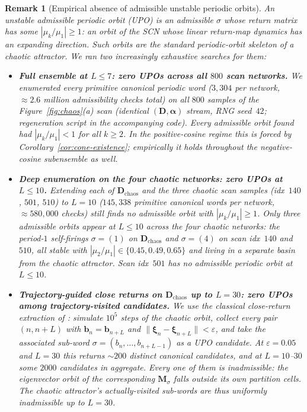 \documentclass[12pt]{article}
\newcommand{\vv}[1]{\mathbf{#1}}
\newcommand{\DD}{\vv{D}}
\newcommand{\xxi}{\boldsymbol{\xi}}
\newtheorem{remark}{Remark}
\begin{document}
\begin{remark}[Empirical absence of admissible unstable periodic orbits]\label{rem:existence-EI}
An \emph{unstable admissible periodic orbit} (UPO) is an admissible $\sigma$ whose return matrix has some $|\mu_k/\mu_1|\geq 1$: an orbit of the SCN whose linear return-map dynamics has an expanding direction. Such orbits are the standard periodic-orbit skeleton of a chaotic attractor. We ran two increasingly exhaustive searches for them:

\begin{itemize}[nosep,leftmargin=1.2em]
\item[(i)] \textbf{Full ensemble at $L\leq 7$: zero UPOs across all $800$ scan networks.} We enumerated every primitive canonical periodic word ($3{,}304$ per network, $\approx 2.6$ million admissibility checks total) on all $800$ samples of the Figure~\ref{fig:chaos}(a) scan (identical $(\vv{D},\boldsymbol{\alpha})$ stream, RNG seed~$42$; regeneration script in the accompanying code). Every admissible orbit found had $|\mu_k/\mu_1|<1$ for all $k\geq 2$. In the positive-cosine regime this is forced by Corollary~\ref{cor:cone-existence}; empirically it holds throughout the negative-cosine subensemble as well.
\item[(ii)] \textbf{Deep enumeration on the four chaotic networks: zero UPOs at $L\leq 10$.} Extending each of $\DD_{\text{chaos}}$ and the three chaotic scan samples (idx~$140$, $501$, $510$) to $L{=}10$ ($145{,}338$ primitive canonical words per network, $\approx 580{,}000$ checks) still finds no admissible orbit with $|\mu_k/\mu_1|\geq 1$. Only three admissible orbits appear at $L\leq 10$ across the four chaotic networks: the period-$1$ self-firings $\sigma{=}(1)$ on $\DD_{\text{chaos}}$ and $\sigma{=}(4)$ on scan idx~$140$ and $510$, all stable with $|\mu_2/\mu_1|\in\{0.45, 0.49, 0.65\}$ and living in a separate basin from the chaotic attractor. Scan idx~$501$ has no admissible periodic orbit at $L\leq 10$.
\item[(iii)] \textbf{Trajectory-guided close returns on $\DD_{\text{chaos}}$ up to $L{=}30$: zero UPOs among trajectory-visited candidates.} We use the classical close-return extraction of \citet{auerbach1987exploring}: simulate $10^5$ steps of the chaotic orbit, collect every pair $(n, n{+}L)$ with $\vv{b}_n{=}\vv{b}_{n+L}$ and $\|\xxi_n{-}\xxi_{n+L}\|<\varepsilon$, and take the associated sub-word $\sigma=(b_n,\ldots,b_{n+L-1})$ as a UPO candidate. At $\varepsilon{=}0.05$ and $L{=}30$ this returns ${\sim}200$ distinct canonical candidates, and at $L{=}10$--$30$ some $2000$ candidates in aggregate. Every one of them is inadmissible: the eigenvector orbit of the corresponding $\vv{M}_\sigma$ falls outside its own partition cells. The chaotic attractor's actually-visited sub-words are thus uniformly inadmissible up to $L{=}30$.
\end{itemize}


\end{remark}
\end{document}
